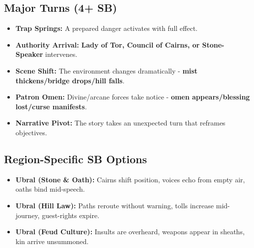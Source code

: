 \subsection*{Major Turns (4+ SB)}
\begin{itemize}
\item \textbf{Trap Springs:} A prepared danger activates with full effect.
\item \textbf{Authority Arrival:} \textbf{Lady of Tor, Council of Cairns, or Stone-Speaker} intervenes.
\item \textbf{Scene Shift:} The environment changes dramatically - \textbf{mist thickens/bridge drops/hill falls}.
\item \textbf{Patron Omen:} Divine/arcane forces take notice - \textbf{omen appears/blessing lost/curse manifests}.
\item \textbf{Narrative Pivot:} The story takes an unexpected turn that reframes objectives.
\end{itemize}

\subsection*{Region-Specific SB Options}
\begin{itemize}
\item \textbf{Ubral (Stone \& Oath):} Cairns shift position, voices echo from empty air, oaths bind mid-speech.
\item \textbf{Ubral (Hill Law):} Paths reroute without warning, tolls increase mid-journey, guest-rights expire.
\item \textbf{Ubral (Feud Culture):} Insults are overheard, weapons appear in sheaths, kin arrive unsummoned.
\end{itemize}
